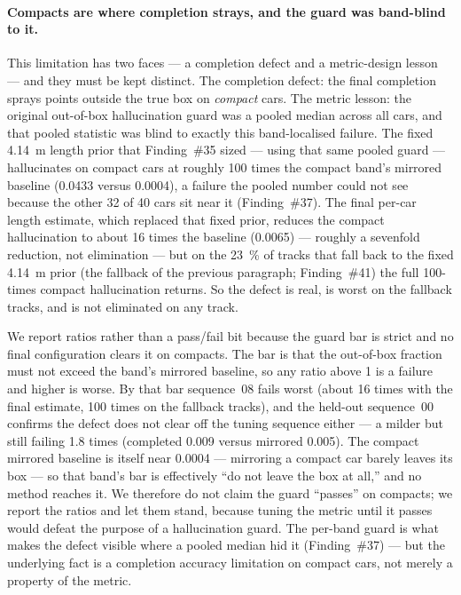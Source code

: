 \paragraph{Compacts are where completion strays, and the guard was band-blind to it.}
This limitation has two faces --- a completion defect and a metric-design lesson --- and
they must be kept distinct. The completion defect: the final completion sprays points
outside the true box on \emph{compact} cars. The metric lesson: the original out-of-box
hallucination guard was a pooled median across all cars, and that pooled statistic was
blind to exactly this band-localised failure. The fixed \SI{4.14}{\metre} length prior
that Finding~\#35 sized --- using that same pooled guard --- hallucinates on compact cars
at roughly \num{100} times the compact band's mirrored baseline (\num{0.0433} versus
\num{0.0004}), a failure the pooled number could not see because the other \num{32} of
\num{40} cars sit near it (Finding~\#37). The final per-car length estimate, which
replaced that fixed prior, reduces the compact hallucination to about \num{16} times the
baseline (\num{0.0065}) --- roughly a sevenfold reduction, not elimination --- but on the
\SI{23}{\percent} of tracks that fall back to the fixed \SI{4.14}{\metre} prior (the
fallback of the previous paragraph; Finding~\#41) the full \num{100}-times compact
hallucination returns. So the defect is real, is worst on the fallback tracks, and is not
eliminated on any track.

We report ratios rather than a pass/fail bit because the guard bar is strict and no
final configuration clears it on compacts. The bar is that the out-of-box fraction must
not exceed the band's mirrored baseline, so any ratio above \num{1} is a failure and
higher is worse. By that bar sequence~08 fails worst (about \num{16} times with the
final estimate, \num{100} times on the fallback tracks), and the held-out sequence~00
confirms the defect does not clear off the tuning sequence either --- a milder but still
failing \num{1.8} times (completed \num{0.009} versus mirrored \num{0.005}). The compact
mirrored baseline is itself near \num{0.0004} --- mirroring a compact car barely leaves its
box --- so that band's bar is effectively ``do not leave the box at all,'' and no method
reaches it. We therefore do not claim the guard ``passes'' on compacts; we report the
ratios and let them stand, because tuning the metric until it passes would defeat the
purpose of a hallucination guard. The per-band guard is what makes the defect visible
where a pooled median hid it (Finding~\#37) --- but the underlying fact is a completion
accuracy limitation on compact cars, not merely a property of the metric.

